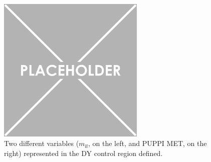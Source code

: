 \documentclass[a4paper, 10pt, openright]{report}
\begin{document}
\begin{figure}[htbp]
{\begin{minipage}[b]{.48\textwidth}
\end{minipage}\hfill
\begin{minipage}[b]{.48\textwidth}
\includegraphics[width=7cm, height=7cm]{figs/placeholder.png}
\end{minipage} \hfill
}
\caption{Two different variables ($m_{ll}$, on the left, and \ac{PUPPI} \ac{MET}, on the right) represented in the \ac{DY} control region defined.}
\label{fig:DYCR}
\end{figure}
\end{document}
